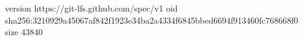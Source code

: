 version https://git-lfs.github.com/spec/v1
oid sha256:3210929a45067af842f1923e34ba2a4334f6845bbed6694f913460fc768668f0
size 43840
